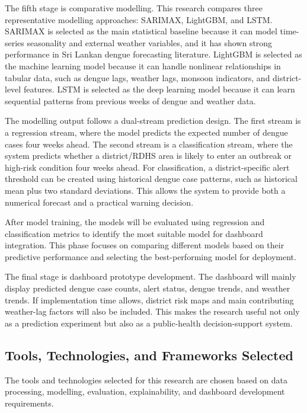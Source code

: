\documentclass[12pt,a4paper]{article}
\begin{document}
The fifth stage is comparative modelling. This research compares three representative modelling approaches: SARIMAX, LightGBM, and LSTM. SARIMAX is selected as the main statistical baseline because it can model time-series seasonality and external weather variables, and it has shown strong performance in Sri Lankan dengue forecasting literature. LightGBM is selected as the machine learning model because it can handle nonlinear relationships in tabular data, such as dengue lags, weather lags, monsoon indicators, and district-level features. LSTM is selected as the deep learning model because it can learn sequential patterns from previous weeks of dengue and weather data.

The modelling output follows a dual-stream prediction design. The first stream is a regression stream, where the model predicts the expected number of dengue cases four weeks ahead. The second stream is a classification stream, where the system predicts whether a district/RDHS area is likely to enter an outbreak or high-risk condition four weeks ahead. For classification, a district-specific alert threshold can be created using historical dengue case patterns, such as historical mean plus two standard deviations. This allows the system to provide both a numerical forecast and a practical warning decision.

After model training, the models will be evaluated using regression and classification metrics to identify the most suitable model for dashboard integration. This phase focuses on comparing different models based on their predictive performance and selecting the best-performing model for deployment.

The final stage is dashboard prototype development. The dashboard will mainly display predicted dengue case counts, alert status, dengue trends, and weather trends. If implementation time allows, district risk maps and main contributing weather-lag factors will also be included. This makes the research useful not only as a prediction experiment but also as a public-health decision-support system.

\subsection{Tools, Technologies, and Frameworks Selected}

The tools and technologies selected for this research are chosen based on data processing, modelling, evaluation, explainability, and dashboard development requirements.
\end{document}
